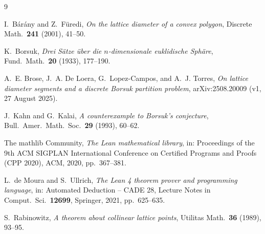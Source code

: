 \documentclass[11pt]{article}
\theoremstyle{remark}
\begin{document}
\begin{thebibliography}{9}

I.~B\'ar\'any and Z.~F\"uredi,
\emph{On the lattice diameter of a convex polygon},
Discrete Math.\ \textbf{241} (2001), 41--50.

K.~Borsuk,
\emph{Drei S\"atze \"uber die $n$-dimensionale euklidische Sph\"are},
Fund.\ Math.\ \textbf{20} (1933), 177--190.

A.~E. Brose, J.~A. De Loera, G.~Lopez-Campos, and A.~J. Torres,
\emph{On lattice diameter segments and a discrete Borsuk partition problem},
arXiv:2508.20009 (v1, 27 August 2025).

J.~Kahn and G.~Kalai,
\emph{A counterexample to Borsuk's conjecture},
Bull.\ Amer.\ Math.\ Soc.\ \textbf{29} (1993), 60--62.

The mathlib Community,
\emph{The Lean mathematical library},
in: Proceedings of the 9th ACM SIGPLAN International Conference on Certified
Programs and Proofs (CPP 2020), ACM, 2020, pp.~367--381.

L.~de Moura and S.~Ullrich,
\emph{The Lean 4 theorem prover and programming language},
in: Automated Deduction -- CADE 28, Lecture Notes in Comput.\ Sci.\
\textbf{12699}, Springer, 2021, pp.~625--635.

S.~Rabinowitz,
\emph{A theorem about collinear lattice points},
Utilitas Math.\ \textbf{36} (1989), 93--95.

\end{thebibliography}
\end{document}
